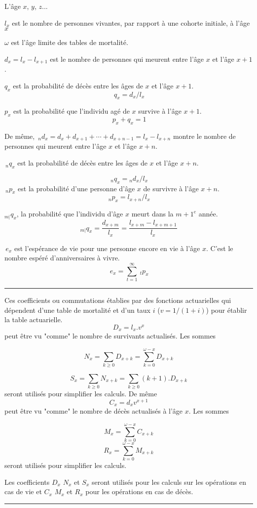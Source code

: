 
\begin{f}

L'âge $x$, $y$, $z$...    

$l_x$ est le nombre de personnes vivantes, par rapport à une cohorte initiale, à l'âge $x$

$\omega$ est l'âge limite des tables de mortalité.

$d_x=l_x-l_{x+1}$ est le nombre de personnes qui meurent entre l'âge $x$ et l'âge $x+1$.

$q_x$ est la probabilité de décès entre les âges de $x$ et l'âge $x+1$.
$$
\,q_x = d_x / l_x 
$$

$p_x$ est la probabilité que l'individu agé de $x$ survive à l'âge $x+1$.
$$
\,p_x+q_x=1 
$$

De même, 
$\,_nd_x = d_x + d_{x+1} + \cdots + d_{x+n-1} = l_x - l_{x+n}$ montre le nombre de personnes qui meurent entre l'âge $x$ et l'âge $x+n$.

$\,_nq_x$ est la probabilité de décès entre les âges de $x$ et l'âge $x+n$.

$$
\,_nq_x = {}_nd_x / l_x
$$
$\,_np_x$ est la probabilité d'une personne d'âge $x$ de survivre à l'âge $x+n$.
$$
\,_np_x = l_{x+n} / l_x 
$$


${}_{m|}q_{x}$, la probabilité que l'individu d'âge $x$ meurt dans la ${m+1}^e$ année.
$${}_{m|}q_{x}=\frac{d_{x+m}}{l_x}=\frac{l_{x+m}-l_{x+m+1}}{l_x}$$

$\,e_x$  est l'espérance de vie pour une personne encore en vie à l'âge $x$. 
C'est le nombre espéré d'anniversaires à vivre.
$$
\,e_x = \sum_{t=1}^{\infty} \ _tp_x 
$$
\end{f}
\hrule

\begin{f}


Ces coefficients ou commutations établies par des fonctions actuarielles qui dépendent d'une table de mortalité et d'un taux $i$ ($v=1/(1+i)$) pour établir la table actuarielle. 
$$
D_x=l_x .v^x
$$
peut être vu "comme" le nombre de survivants actualisés. Les sommes 

$$
N_x=\sum_{k\geq 0} D_{x+k}=\sum_{k= 0}^{\omega-x} D_{x+k}
$$

$$
S_x=\sum_{k\geq 0} N_{x+k}=\sum_{k\geq 0}(k+1). D_{x+k}
$$
seront utilisés pour simplifier les calculs.
De même
$$
C_x = d_x v^{ x+1} 
$$
peut être vu "comme" le nombre de décès  actualisés à l'âge $x$. Les sommes

$$
M_x=\sum_{k= 0}^{\omega-x} C_{x+k}
$$
$$
R_x=\sum_{k= 0}^{\omega-x} M_{x+k}
$$
seront utilisés pour simplifier les calculs.

Les  coefficients $D_x$ $N_x$ et $S_x$ seront utilisés pour les calculs sur les opérations en cas de vie et $C_x$ $M_x$ et $R_x$  pour les opérations en cas de décès.

\end{f} 
\hrule

